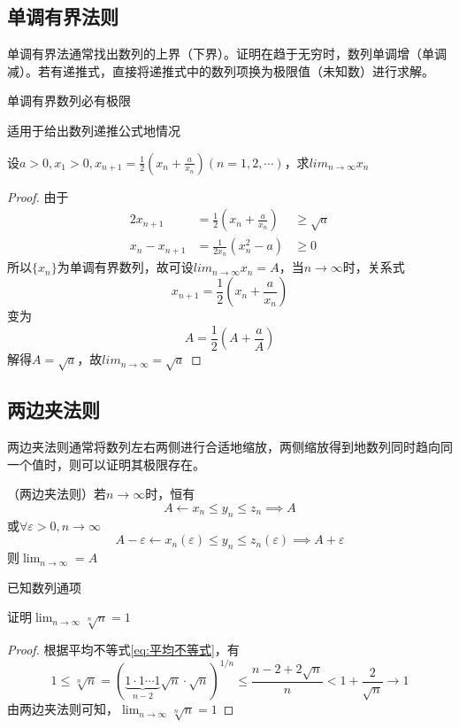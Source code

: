 \pagebreak
\subsection{单调有界法则}
单调有界法通常找出数列的上界（下界）。证明在趋于无穷时，数列单调增（单调减）。若有递推式，直接将递推式中的数列项换为极限值（未知数）进行求解。
\begin{theorem}
    \label{th:单调有界法则}
    单调有界数列必有极限
\end{theorem}
\begin{situation}
    适用于给出数列递推公式地情况
\end{situation}
\begin{example}
    设$a>0, x_1 > 0, x_{n+1} = \frac{1}{2}(x_n+\frac{a}{x_n}) (n=1,2,\cdots)$，求$lim_{n\to\infty}x_n$
\end{example}
\begin{proof}
    由于
    \begin{alignat*}{2}
        x_{n+1}         & = \frac{1}{2}(x_n+\frac{a}{x_n}) & \geq  \sqrt{a} \\
        x_{n} - x_{n+1} & = \frac{1}{2x_n}(x_n^2-a)        & \geq  0
    \end{alignat*}
    所以$\{x_n\}$为单调有界数列，故可设$lim_{n\to\infty} x_n = A$，当$n\to\infty$时，关系式
    \[ x_{n+1} = \frac{1}{2}(x_n+\frac{a}{x_n}) \]
    变为
    \[ A = \frac{1}{2}(A+\frac{a}{A}) \]
    解得$A=\sqrt{a}$，故$lim_{n\to\infty}=\sqrt{a}$
\end{proof}

\subsection{两边夹法则}
两边夹法则通常将数列左右两侧进行合适地缩放，两侧缩放得到地数列同时趋向同一个值时，则可以证明其极限存在。
\begin{theorem}
    \label{th:两边夹法则}
    （两边夹法则）若$n\to\infty$时，恒有
    \[ A \leftarrow x_n \leq y_n \leq z_n \implies A \]
    或$\forall \varepsilon > 0, n\to\infty$
    \[ A -\varepsilon \leftarrow x_n(\varepsilon) \leq y_n \leq z_n(\varepsilon) \implies A + \varepsilon \]
    则$\lim_{n \to\infty}=A$
\end{theorem}
\begin{situation}
    已知数列通项
\end{situation}
\begin{example}
    证明$\lim_{n\to\infty}\sqrt[n]{n} = 1$
\end{example}
\begin{proof}
    根据平均不等式\ref{eq:平均不等式}，有
    \[ 1 \leq \sqrt[n]{n} = (\underbrace{1\cdot 1\cdots 1}_{n-2}\sqrt{n}\cdot\sqrt{n})^{1/n}\leq \frac{n-2+2\sqrt{n}}{n} < 1+\frac{2}{\sqrt{n}} \to 1 \]
    由两边夹法则可知，$\lim_{n\to\infty}\sqrt[n]{n} = 1$
\end{proof}

